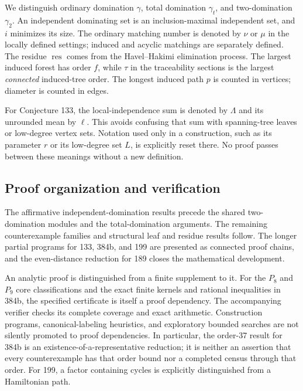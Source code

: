 \documentclass[11pt,a4paper]{article}
\theoremstyle{definition}\newtheorem{definition}[theorem]{Definition}
\theoremstyle{remark}\newtheorem{remark}[theorem]{Remark}
\newcommand{\res}{\operatorname{res}}
\begin{document}
We distinguish ordinary domination $\gamma$, total domination $\gamma_t$,
and two-domination $\gamma_2$. An independent dominating set is an
inclusion-maximal independent set, and $i$ minimizes its size.
The ordinary matching number is denoted by $\nu$ or $\mu$ in the
locally defined settings; induced and acyclic matchings are separately
defined. The residue $\res$ comes from the Havel--Hakimi elimination
process. The largest induced forest has order $f$, while $\tau$ in
the traceability sections is the largest \emph{connected} induced-tree
order. The longest induced path $p$ is counted in vertices; diameter
is counted in edges.

For Conjecture 133, the local-independence sum is denoted by $\Lambda$
and its unrounded mean by $\ell$. This avoids confusing that sum with
spanning-tree leaves or low-degree vertex sets. Notation used only in
a construction, such as its parameter $r$ or its low-degree set $L$,
is explicitly reset there. No proof passes between these meanings
without a new definition.

\subsection{Proof organization and verification}
The affirmative independent-domination results precede the shared
two-domination modules and the total-domination arguments. The remaining
counterexample families and structural leaf and residue results follow.
The longer partial programs for 133, 384b, and 199 are presented as
connected proof chains, and the even-distance reduction for 189 closes
the mathematical development.

An analytic proof is distinguished from a finite supplement to it.
For the $P_8$ and $P_9$ core classifications and the exact finite kernels
and rational inequalities in 384b, the specified certificate is itself
a proof dependency. The accompanying verifier checks its complete
coverage and exact arithmetic. Construction programs, canonical-labeling
heuristics, and exploratory bounded searches are not silently promoted
to proof dependencies. In particular, the order-37 result for 384b is
an existence-of-a-representative reduction; it is neither an assertion
that every counterexample has that order bound nor a completed census
through that order. For 199, a factor containing cycles is explicitly
distinguished from a Hamiltonian path.


\end{document}

